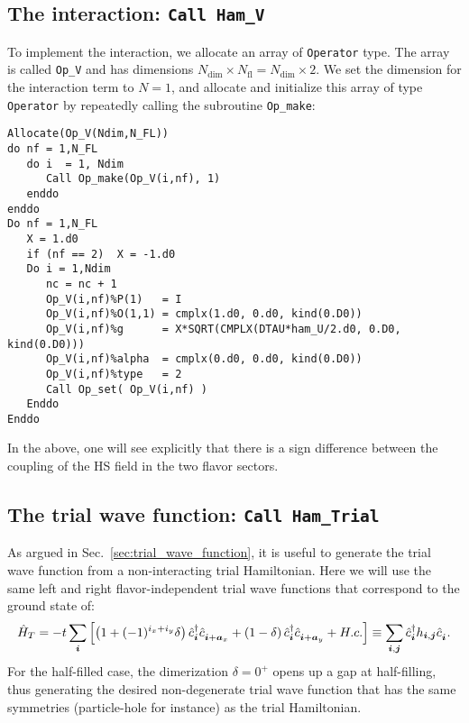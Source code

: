 \subsection{The interaction: \texttt{Call Ham\_V}}
To implement  the interaction, we allocate an array of \texttt{Operator} type. The array is called  \texttt{Op\_V} and has dimensions $N_{\mathrm{dim}}\times N_{\mathrm{fl}}=N_{\mathrm{dim}} \times 2$. 
We set the dimension for the interaction term to  $N=1$, and  allocate and initialize this array of type  \texttt{Operator} by repeatedly calling the subroutine \texttt{Op\_make}: 

\begin{lstlisting}[style=fortran]
Allocate(Op_V(Ndim,N_FL))
do nf = 1,N_FL
   do i  = 1, Ndim
      Call Op_make(Op_V(i,nf), 1)
   enddo
enddo
Do nf = 1,N_FL
   X = 1.d0
   if (nf == 2)  X = -1.d0
   Do i = 1,Ndim
      nc = nc + 1
      Op_V(i,nf)%P(1)   = I
      Op_V(i,nf)%O(1,1) = cmplx(1.d0, 0.d0, kind(0.D0))
      Op_V(i,nf)%g      = X*SQRT(CMPLX(DTAU*ham_U/2.d0, 0.D0, kind(0.D0))) 
      Op_V(i,nf)%alpha  = cmplx(0.d0, 0.d0, kind(0.D0))
      Op_V(i,nf)%type   = 2
      Call Op_set( Op_V(i,nf) )
   Enddo
Enddo

\end{lstlisting}
In the above, one will see explicitly that  there is a sign   difference between  the coupling of the HS field  in  the  two flavor sectors. 

\subsection{The trial wave function: \texttt{Call Ham\_Trial}}
As  argued in Sec.~\ref{sec:trial_wave_function}, it is useful to generate the trial wave function from a non-interacting trial Hamiltonian.   Here we will  use the same left and right  flavor-independent trial wave functions that correspond to the ground state of: 
\begin{equation}
   \hat{H}_T    = - t \sum_{\ve{i}} \left[  \left( 1 + (-1)^{i_x + i_y}  \delta \right)  \hat{c}^{\dagger}_{\ve{i}}   \hat{c}^{\phantom\dagger}_{\ve{i} +\ve{a}_x}  +  
   							\left(1 - \delta \right)  \hat{c}^{\dagger}_{\ve{i}}   \hat{c}^{\phantom\dagger}_{\ve{i} +\ve{a}_y}    + H.c.  \right]   \equiv   \sum_{\ve{i},\ve{j}}  \hat{c}^{\dagger}_{\ve{i}}   h_{\ve{i},\ve{j}}  \hat{c}^{\phantom\dagger}_{\ve{i}}.
\end{equation}
For the half-filled case, the  dimerization $\delta  = 0^{+} $  opens up a gap at  half-filling,   thus generating the desired  non-degenerate  trial wave function  that has the same symmetries (particle-hole  for instance) as  the   trial  Hamiltonian.

